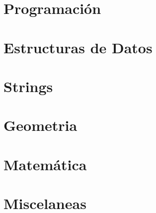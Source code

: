 \documentclass{article}
\begin{document}
\tableofcontents

\pagebreak

\section{Programación}

\pagebreak

\pagebreak

\section{Estructuras de Datos}

\pagebreak

\section{Strings}

\pagebreak

\section{Geometria}

\pagebreak

\section{Matemática}

\pagebreak

\pagebreak

\pagebreak
%

\section{Miscelaneas}

\pagebreak

\listoftodos[TODOs]
\end{document}
